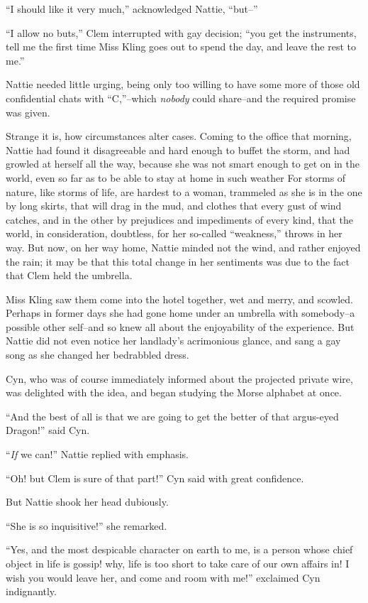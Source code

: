 ``I should like it very much,'' acknowledged Nattie, ``but--''

``I allow no buts,'' Clem interrupted with gay decision; ``you get the
instruments, tell me the first time Miss Kling goes out to spend the
day, and leave the rest to me.''

Nattie needed little urging, being only too willing to have some more of
those old confidential chats with ``C,''--which \emph{nobody} could share--and
the required promise was given.

Strange it is, how circumstances alter cases. Coming to the office that
morning, Nattie had found it disagreeable and hard enough to buffet the
storm, and had growled at herself all the way, because she was not smart
enough to get on in the world, even so far as to be able to stay at home
in such weather For storms of nature, like storms of life, are hardest
to a woman, trammeled as she is in the one by long skirts, that will
drag in the mud, and clothes that every gust of wind catches, and in the
other by prejudices and impediments of every kind, that the world, in
consideration, doubtless, for her so-called ``weakness,'' throws in her
way. But now, on her way home, Nattie minded not the wind, and rather
enjoyed the rain; it may be that this total change in her sentiments was
due to the fact that Clem held the umbrella.

Miss Kling saw them come into the hotel together, wet and merry, and
scowled. Perhaps in former days she had gone home under an umbrella with
somebody--a possible other self--and so knew all about the enjoyability
of the experience. But Nattie did not even notice her landlady's
acrimonious glance, and sang a gay song as she changed her bedrabbled
dress.

Cyn, who was of course immediately informed about the projected private
wire, was delighted with the idea, and began studying the Morse alphabet
at once.

``And the best of all is that we are going to get the better of that
argus-eyed Dragon!'' said Cyn.

``\emph{If} we can!'' Nattie replied with emphasis.

``Oh! but Clem is sure of that part!'' Cyn said with great confidence.

But Nattie shook her head dubiously.

``She is so inquisitive!'' she remarked.

``Yes, and the most despicable character on earth to me, is a person
whose chief object in life is gossip! why, life is too short to take
care of our own affairs in! I wish you would leave her, and come and
room with me!'' exclaimed Cyn indignantly.

